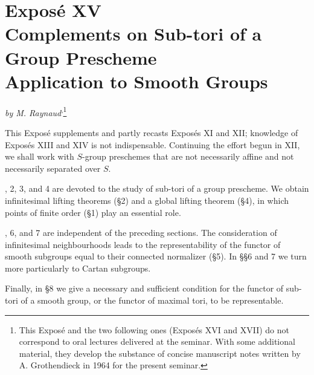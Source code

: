 
\chapter*{Exposé XV\\Complements on Sub-tori of a Group Prescheme\\
Application to Smooth Groups}

\begin{center}
\textit{by M. Raynaud}\textsuperscript{,}\footnote{This Exposé and the two following ones
(Exposés XVI and XVII) do not correspond to oral lectures delivered at
the seminar. With some additional material, they develop the substance
of concise manuscript notes written by A. Grothendieck in 1964 for the
present seminar.}
\end{center}


This Exposé supplements and partly recasts Exposés XI and XII; knowledge
of Exposés XIII and XIV is not indispensable. Continuing the effort
begun in XII, we shall work with \(S\)-group preschemes that are not
necessarily affine and not necessarily separated over \(S\).

, 2, 3, and 4 are devoted to the study of sub-tori of a group
prescheme. We obtain infinitesimal lifting theorems (§2) and a global
lifting theorem (§4), in which points of finite order (§1) play an
essential role.

, 6, and 7 are independent of the preceding sections. The
consideration of infinitesimal neighbourhoods leads to the
representability of the functor of smooth subgroups equal to their
connected normalizer (§5). In §§6 and 7 we turn more particularly to
Cartan subgroups.

Finally, in §8 we give a necessary and sufficient condition for the
functor of sub-tori of a smooth group, or the functor of maximal tori,
to be representable.
